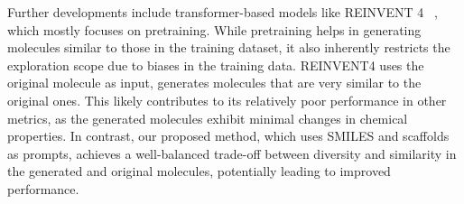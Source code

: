 Further developments include transformer-based models like REINVENT 4 ~\citep{he2021molecular, he2022transformer, loeffler2024reinvent}, which mostly focuses on pretraining. While pretraining helps in generating molecules similar to those in the training dataset, it also inherently restricts the exploration scope due to biases in the training data.
REINVENT4 uses the original molecule as input, generates molecules that are very similar to the original ones. This likely contributes to its relatively poor performance in other metrics, as the generated molecules exhibit minimal changes in chemical properties. 
In contrast, our proposed method, which uses SMILES and scaffolds as prompts, achieves a well-balanced trade-off between diversity and similarity in the generated and original molecules, potentially leading to improved performance.
















